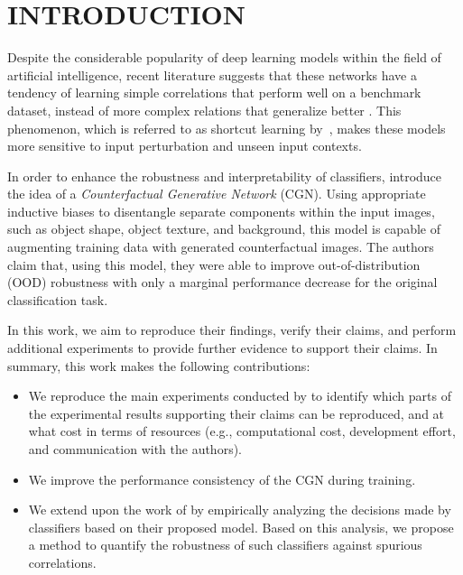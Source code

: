 \section{INTRODUCTION}

Despite the considerable popularity of deep learning models within the field of artificial intelligence, recent literature suggests that these networks have a tendency of learning simple correlations that perform well on a benchmark dataset, instead of more complex relations that generalize better \cite{alcorn2019strike, ming2021impact, rosenfeld2018elephant}. This phenomenon, which is referred to as shortcut learning by~, makes these models more sensitive to input perturbation and unseen input contexts.

In order to enhance the robustness and interpretability of classifiers,  introduce the idea of a \emph{Counterfactual Generative Network} (CGN).
Using appropriate inductive biases to disentangle separate components within the input images, such as object shape, object texture, and background, this model is capable of augmenting training data with generated counterfactual images.
The authors claim that, using this model, they were able to improve out-of-distribution (OOD) robustness with only a marginal performance decrease for the original classification task.

In this work, we aim to reproduce their findings, verify their claims, and perform additional experiments to provide further evidence to support their claims. In summary, this work makes the following contributions:
\begin{itemize}
    \item We reproduce the main experiments conducted by  to identify which parts of the experimental results supporting their claims can be reproduced, and at what cost in terms of resources (e.g., computational cost, development effort, and communication with the authors).
    \item We improve the performance consistency of the CGN during training.
    \item We extend upon the work of \citeauthor{Sauer2021ICLR} by empirically analyzing the decisions made by classifiers based on their proposed model. Based on this analysis, we propose a method to quantify the robustness of such classifiers against spurious correlations.
\end{itemize}

